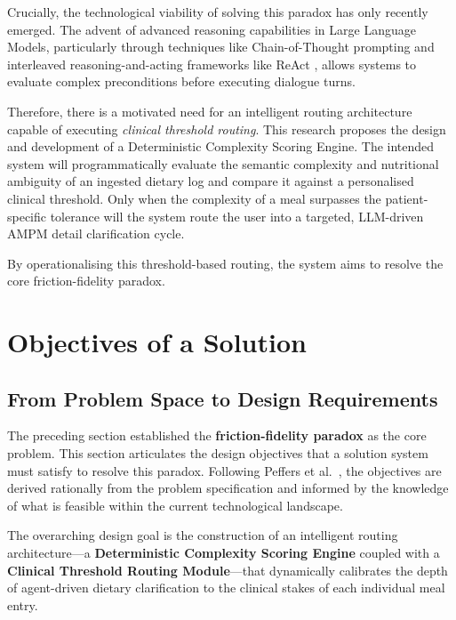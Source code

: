 Crucially, the technological viability of solving this paradox has only recently emerged. The advent of advanced reasoning capabilities in Large Language Models, particularly through techniques like Chain-of-Thought prompting \citep{weiChainofthoughtPromptingElicits2022} and interleaved reasoning-and-acting frameworks like ReAct \citep{yaoReActSynergizingReasoning2022}, allows systems to evaluate complex preconditions before executing dialogue turns.

Therefore, there is a motivated need for an intelligent routing architecture capable of executing \emph{clinical threshold routing}. This research proposes the design and development of a Deterministic Complexity Scoring Engine. The intended system will programmatically evaluate the semantic complexity and nutritional ambiguity of an ingested dietary log and compare it against a personalised clinical threshold. Only when the complexity of a meal surpasses the patient-specific tolerance will the system route the user into a targeted, LLM-driven AMPM detail clarification cycle.

By operationalising this threshold-based routing, the system aims to resolve the core friction-fidelity paradox.

\section{Objectives of a Solution}

\subsection{From Problem Space to Design Requirements}

The preceding section established the \textbf{friction-fidelity paradox} as the core problem. This section articulates the design objectives that a solution system must satisfy to resolve this paradox. Following Peffers et al.\ \citep{peffersDesignScienceResearch2007}, the objectives are derived rationally from the problem specification and informed by the knowledge of what is feasible within the current technological landscape.

The overarching design goal is the construction of an intelligent routing architecture---a \textbf{Deterministic Complexity Scoring Engine} coupled with a \textbf{Clinical Threshold Routing Module}---that dynamically calibrates the depth of agent-driven dietary clarification to the clinical stakes of each individual meal entry.

